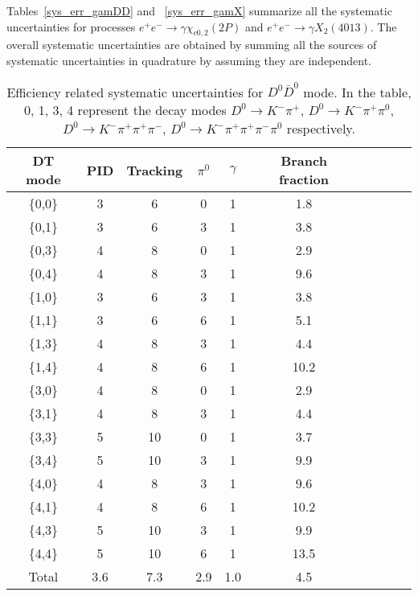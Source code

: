 \documentclass[aps,preprint,tightenlines,superscriptaddress,showpacs,byrevtex,amsmath,amssymb,nofloatfix]{revtex4}
\begin{document}
Tables~\ref{sys_err_gamDD} and ~\ref{sys_err_gamX} summarize all the systematic uncertainties for processes $e^{+}e^{-} \rightarrow \gamma \chi_{c0,2}(2P)$ and $e^{+}e^{-} \rightarrow \gamma X_{2}(4013)$. The overall systematic uncertainties are obtained by summing all the sources of systematic uncertainties in quadrature by assuming they are independent.


\begin{table}[!htbp]
\captionsetup{justification=raggedright}
\caption{Efficiency related systematic uncertainties for $D^{0}\bar{D}^{0}$ mode. In the table, 0, 1, 3, 4 represent the decay modes $D^{0} \rightarrow K^{-}\pi^{+}$, $D^{0} \rightarrow K^{-}\pi^{+}\pi^{0}$, $D^{0} \rightarrow K^{-}\pi^{+}\pi^{+}\pi^{-}$, $D^{0} \rightarrow K^{-}\pi^{+}\pi^{+}\pi^{-}\pi^{0}$ respectively.}
\label{efficiency D0mode}
\begin{tabular}{c c c c c c c c c c}
\hline \hline
     DT mode    &PID  &Tracking   &$\pi^{0}$  &$\gamma$  &Branch fraction   \\
    \hline
     \{0,0\}     &3    &6     &0  &1 &1.8           \\
     \{0,1\}     &3    &6     &3  &1 &3.8           \\
     \{0,3\}     &4    &8     &0  &1 &2.9          \\
     \{0,4\}     &4    &8     &3  &1 &9.6          \\
     \{1,0\}     &3    &6     &3  &1 &3.8           \\
     \{1,1\}     &3    &6     &6  &1 &5.1          \\
     \{1,3\}     &4    &8     &3  &1 &4.4          \\
     \{1,4\}     &4    &8     &6  &1 &10.2         \\
     \{3,0\}     &4    &8     &0  &1 &2.9          \\
     \{3,1\}     &4    &8     &3  &1 &4.4          \\
     \{3,3\}     &5    &10    &0  &1 &3.7          \\
     \{3,4\}     &5    &10    &3  &1 &9.9          \\
     \{4,0\}     &4    &8     &3  &1 &9.6          \\
     \{4,1\}     &4    &8     &6  &1 &10.2         \\
     \{4,3\}     &5    &10    &3  &1 &9.9          \\
     \{4,4\}     &5    &10    &6  &1 &13.5         \\
     \hline
     Total       &3.6  &7.3  &2.9   &1.0  &4.5      \\
    \hline \hline
\end{tabular}
\end{table}
\end{document}
